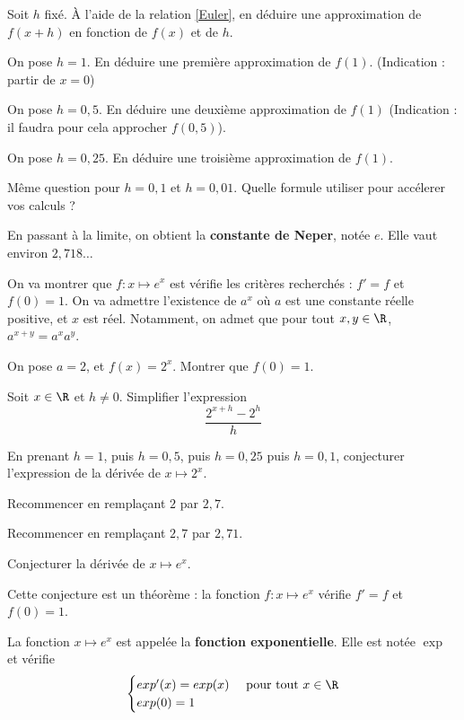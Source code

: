 \documentclass{article}
\begin{document}
\begin{enumquestions}
\item Soit $h$ fixé. À l'aide de la relation \eqref{Euler}, en déduire une approximation de $f(x + h)$ en fonction de $f(x)$ et de $h$.
\item On pose $h = 1$. En déduire une première approximation de $f(1)$. (Indication : partir de $x = 0$)
\item On pose $h = 0,5$. En déduire une deuxième approximation de $f(1)$ (Indication : il faudra pour cela approcher $f(0,5)$).
\item On pose $h = 0,25$. En déduire une troisième approximation de $f(1)$.
\item Même question pour $h = 0,1$ et $h = 0,01$. Quelle formule utiliser pour accélerer vos calculs ?

En passant à la limite, on obtient la \textbf{constante de Neper}, notée $e$. Elle vaut environ $2,718\dots$

On va montrer que $f : x \mapsto e^x$ est vérifie les critères recherchés : $f' = f$ et $f(0) = 1$. On va admettre l'existence de $a^x$ où $a$ est une constante réelle positive, et $x$ est réel. Notamment, on admet que pour tout $x, y \in \R$, $a^{x + y} = a^x a^y$.

\item On pose $a = 2$, et $f(x) = 2^x$. Montrer que $f(0) = 1$.
\item Soit $x \in \R$ et $h \neq 0$. Simplifier l'expression
\begin{equation*}
\dfrac{2^{x + h} - 2^h}{h}
\end{equation*}
\item En prenant $h = 1$, puis $h = 0,5$, puis $h = 0,25$ puis $h = 0,1$, conjecturer l'expression de la dérivée de $x \mapsto 2^x$.
\item Recommencer en remplaçant $2$ par $2,7$.
\item Recommencer en remplaçant $2,7$ par $2,71$.
\item Conjecturer la dérivée de $x \mapsto e^x$.
\end{enumquestions}
Cette conjecture est un théorème : la fonction $f : x \mapsto e^x$ vérifie $f' = f$ et $f(0) = 1$. 
\begin{tcolorbox}
\begin{definition}
La fonction $x \mapsto e^x$ est appelée la \textbf{fonction exponentielle}. Elle est notée $\exp$ et vérifie
\begin{equation*}
\begin{cases}
exp'(x) = exp(x)& \text{ pour tout } x \in \R\\
exp(0) = 1
\end{cases}
\end{equation*}
\end{definition}
\end{tcolorbox}
\end{document}
